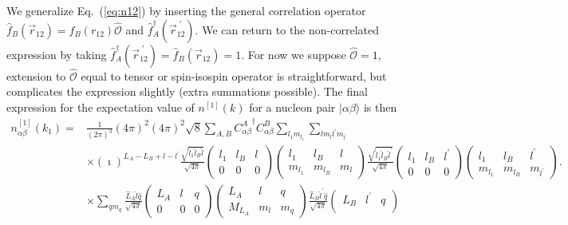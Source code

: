 \documentclass[notitlepage,a4paper,final,amsfonts,amsmath,amssymb]{revtex4-1}
\newcommand{\ket}[1]{\mid #1 \rangle}
\begin{document}
We generalize Eq.~(\ref{eq:n12}) 
by inserting the general correlation operator $\hat{f}_B(\vec{r}_{12})= f_B(r_{12}) \hat{\mathcal{O}}$ and $\hat{f}_A^\dagger(\vec{r}_{12}^{\;\prime})$.
We can return to the non-correlated expression by taking $\hat{f}^\dagger_A(\vec{r}_{12}^{\;\prime})=\hat{f}_B(\vec{r}_{12})=1$.
For now we suppose $\hat{\mathcal{O}}=1$, extension to $\hat{\mathcal{O}}$ equal to tensor or spin-isospin operator is straightforward, but complicates the expression slightly (extra summations possible).
The final expression for the expectation value of $n^{[1]}(k)$ for a nucleon pair $\ket{\alpha\beta}$ is then
\begin{align}
  n^{[1]}_{\alpha\beta}(k_1) = {} &
  \frac{1}{(2\pi)^3} (4\pi)^2 (4\pi)^2 \sqrt{8}
  \sum_{A,B} {C_{\alpha\beta}^A}^\dagger C_{\alpha\beta}^B
   \sum_{l_1 m_{l_1}} \sum_{l m_l l^\prime m_{l^\prime}}
   \nonumber \\ & \times
  (\imath)^{L_A-L_B+l-l^\prime}
  \frac{\sqrt{ \hat{l}_1 \hat{l}_B \hat{l}}}{\sqrt{4\pi}} 
  \begin{pmatrix}
    l_1 & l_B & l \\
    0 & 0 & 0
  \end{pmatrix}
  \begin{pmatrix}
    l_1 & l_B & l \\
    m_{l_1} & m_{l_B} & m_l
  \end{pmatrix}
  \frac{\sqrt{ \hat{l}_1 \hat{l}_B \hat{l}^\prime }}{\sqrt{4\pi}} 
  \begin{pmatrix}
    l_1 & l_B & l^\prime \\
    0 & 0 & 0
  \end{pmatrix}
  \begin{pmatrix}
    l_1 & l_B & l^\prime \\
    m_{l_1} & m_{l_B} & m_{l^\prime}
  \end{pmatrix}.
  \nonumber \\ & \times
\sum_{q m_q} 
\frac{ \hat{L}_A \hat{l} \hat{q} }{\sqrt{4\pi}}
\begin{pmatrix}
  L_A & l & q \\
  0 & 0 & 0
\end{pmatrix}
\begin{pmatrix}
  L_A & l & q \\
  M_{L_A} & m_l & m_q
\end{pmatrix}
\frac{ \hat{L}_B \hat{l}^\prime \hat{q} }{\sqrt{4\pi}}
\begin{pmatrix}
  L_B & l^\prime & q \\

\end{pmatrix}
\end{align}
\end{document}
